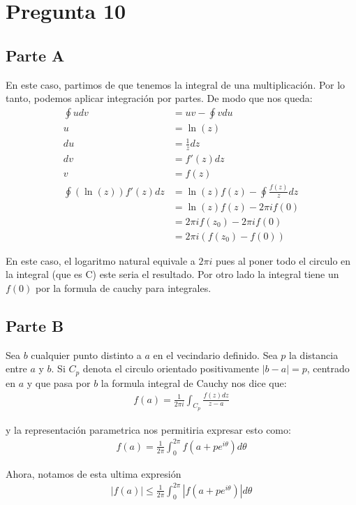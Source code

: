 \documentclass[12pt]{exam}
\begin{document}
\section*{Pregunta 10}

\subsection*{Parte A}

En este caso, partimos de que tenemos la integral de una multiplicación. Por lo tanto, podemos aplicar integración por partes. De modo que nos queda:
\begin{align*}
	\oint u dv &= uv - \oint vdu\\
	u &= \ln(z)\\
	du &= \frac{1}{z} dz\\
	dv &= f'(z) dz\\
	v &= f(z) \\
	\oint \left(\ln(z)\right)f'(z)dz &= \ln(z)f(z) - \oint \frac{f(z)}{z}dz\\
	&= \ln(z)f(z) - 2\pi i f(0)\\
	&= 2\pi i f(z_0) - 2 \pi i f(0)\\
	&= 2\pi i (f(z_0) - f(0))
\end{align*}

En este caso, el logaritmo natural equivale a $2\pi i$ pues al poner todo el circulo en la integral (que es C) este seria el resultado. Por otro lado la integral tiene un $f(0)$ por la formula de cauchy para integrales.

\subsection*{Parte B}

Sea $b$ cualquier punto distinto a $a$ en el vecindario definido. Sea $p$ la distancia entre $a$ y $b$. Si $C_p$ denota el circulo orientado positivamente $|b - a| = p$, centrado en $a$ y que pasa por $b$ la formula integral de Cauchy nos dice que:
\begin{align*}
	f(a) = \frac{1}{2\pi i}\int_{C_p}\frac{f(z)dz}{z - a}
\end{align*}

y la representación parametrica nos permitiria expresar esto como:
\begin{align*}
	f(a) = \frac{1}{2\pi}\int_0^{2\pi}f(a + pe^{i\theta})d\theta
\end{align*}

Ahora, notamos de esta ultima expresión
\begin{align*}
	|f(a)|\le \frac{1}{2\pi}\int_{0}^{2\pi}|f(a+pe^{i\theta})| d\theta
\end{align*}
\end{document}
